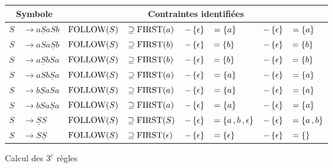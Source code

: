 \documentclass[class=article]{standalone}
\begin{document}
\begin{center}
    \begin{tabular}{|rl|rlllll|}
        \hline
        \multicolumn{2}{|c}{\bf Symbole} &
        \multicolumn{6}{|c|}{\bf Contraintes identifiées}\\
        \hline
        \hline
        $S$ & $\rightarrow a\underline{S}aSb$ & $\text{\lstinline{FOLLOW}}(S)$ & $\supseteq \text{\lstinline{FIRST}}(a)$ & $- \left \{ \epsilon \right \}$ & $= \left \{ a \right \}$ & $- \left \{ \epsilon \right \}$ & $= \left \{ a \right \}$\\
        $S$ & $\rightarrow aSa\underline{S}b$ & $\text{\lstinline{FOLLOW}}(S)$ & $\supseteq \text{\lstinline{FIRST}}(b)$ & $- \left \{ \epsilon \right \}$ & $= \left \{ b \right \}$ & $- \left \{ \epsilon \right \}$ & $= \left \{ b \right \}$\\
        \hline
        $S$ & $\rightarrow a\underline{S}bSa$ & $\text{\lstinline{FOLLOW}}(S)$ & $\supseteq \text{\lstinline{FIRST}}(b)$ & $- \left \{ \epsilon \right \}$ & $= \left \{ b \right \}$ & $- \left \{ \epsilon \right \}$ & $= \left \{ b \right \}$\\
        $S$ & $\rightarrow aSb\underline{S}a$ & $\text{\lstinline{FOLLOW}}(S)$ & $\supseteq \text{\lstinline{FIRST}}(a)$ & $- \left \{ \epsilon \right \}$ & $= \left \{ a \right \}$ & $- \left \{ \epsilon \right \}$ & $= \left \{ a \right \}$\\
        \hline
        $S$ & $\rightarrow b\underline{S}aSa$ & $\text{\lstinline{FOLLOW}}(S)$ & $\supseteq \text{\lstinline{FIRST}}(a)$ & $- \left \{ \epsilon \right \}$ & $= \left \{ a \right \}$ & $- \left \{ \epsilon \right \}$ & $= \left \{ a \right \}$\\
        $S$ & $\rightarrow bSa\underline{S}a$ & $\text{\lstinline{FOLLOW}}(S)$ & $\supseteq \text{\lstinline{FIRST}}(a)$ & $- \left \{ \epsilon \right \}$ & $= \left \{ a \right \}$ & $- \left \{ \epsilon \right \}$ & $= \left \{ a \right \}$\\
        \hline
        $S$ & $\rightarrow \underline{S}S$ & $\text{\lstinline{FOLLOW}}(S)$ & $\supseteq \text{\lstinline{FIRST}}(S)$         & $- \left \{ \epsilon \right \}$ & $= \left \{ a \, , b \, , \epsilon \right \}$ & $- \left \{ \epsilon \right \}$ & $= \left \{ a \, , b \right \}$\\
        $S$ & $\rightarrow S\underline{S}$ & $\text{\lstinline{FOLLOW}}(S)$ & $\supseteq \text{\lstinline{FIRST}}(\epsilon)$ & $- \left \{ \epsilon \right \}$  & $= \left \{ \epsilon \right \}$                & $- \left \{ \epsilon \right \}$ & $= \left \{  \right \}$\\
        \hline
    \end{tabular}
\end{center}
\pagebreak
Calcul des $3^e$ règles
\end{document}
